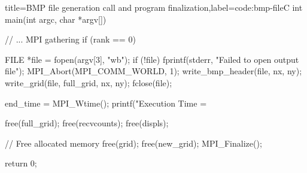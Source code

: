 \documentclass[../main.tex]{subfiles}
\begin{document}
\begin{code}{title=BMP file generation call and program finalization,label=code:bmp-file}{C}
    int main(int argc, char *argv[]) {
        // ... MPI gathering
        if (rank == 0)
        {
            FILE *file = fopen(argv[3], "wb");
            if (!file)
            {
                fprintf(stderr, "Failed to open output file\n");
                MPI_Abort(MPI_COMM_WORLD, 1);
            }
            write_bmp_header(file, nx, ny);
            write_grid(file, full_grid, nx, ny);
            fclose(file);

            end_time = MPI_Wtime();
            printf("Execution Time = %

            free(full_grid);
            free(recvcounts);
            free(displs);
        }

        // Free allocated memory
        free(grid);
        free(new_grid);
        MPI_Finalize();

        return 0;
    }
\end{code}
\end{document}
